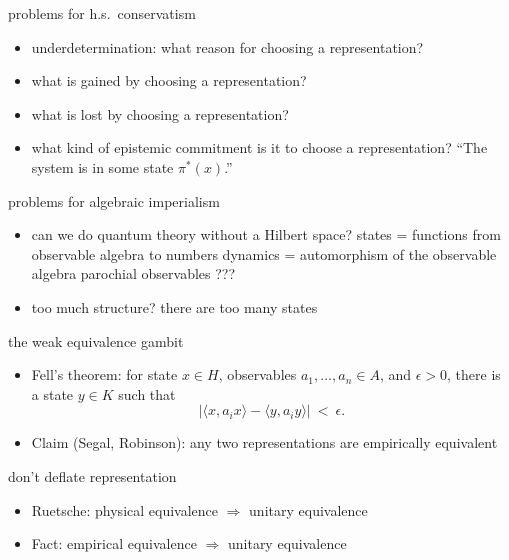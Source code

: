 \documentclass{beamer}
\begin{document}
\begin{frame}{problems for h.s.\ conservatism}

\begin{itemize}
\item underdetermination: what reason for choosing a representation?
\item what is gained by choosing a representation?
\item what is lost by choosing a representation?
\item what kind of epistemic commitment is it to choose a
  representation? \newline
``The system is in some state $\pi ^*(x)$.''
\end{itemize}

\end{frame}

\begin{frame}{problems for algebraic imperialism}

\begin{itemize}
\item can we do quantum theory without a Hilbert space?  \newline
{\small states = functions from observable algebra to numbers \newline
  dynamics = automorphism of the observable algebra \newline
  parochial observables ???}
\item too much structure? \newline
there are too many states
\end{itemize}


\end{frame}

\begin{frame}{the weak equivalence gambit}

\begin{itemize}
\item Fell's theorem: for state $x\in H$, observables $a_1,\dots
  ,a_n\in A$, and $\epsilon >0$, there is a state $y\in K$ such that 
$$ |\langle x,a_ix\rangle - \langle y,a_iy\rangle | \: < \: \epsilon .$$
\item Claim (Segal, Robinson): any two representations are empirically equivalent
\end{itemize}

\end{frame}


\begin{frame}{don't deflate representation}

\begin{itemize}

\item Ruetsche: physical equivalence $\Longrightarrow$ unitary
  equivalence

\item Fact: empirical equivalence $\Longrightarrow$ unitary
  equivalence
\end{itemize}

\end{frame}
\end{document}
